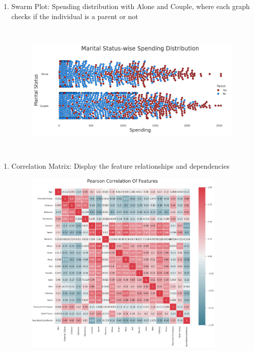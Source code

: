 \documentclass[11pt]{article}
\begin{document}
\begin{enumerate}
	\item Swarm Plot: Spending distribution with Alone and Couple, where each graph checks if the individual is a parent or not

\begin{figure}[H]
\centering
\includegraphics[width=14.24cm,height=6.52cm]{./images/image11.png}
\end{figure}


\end{enumerate}
\vspace{1\baselineskip}
\begin{enumerate}
	\item Correlation Matrix: Display the feature relationships and dependencies

\begin{figure}[H]
\centering
\includegraphics[width=9.67cm,height=8.9cm]{./images/image16.png}
\end{figure}


\end{enumerate}
\vspace{1\baselineskip}
\end{document}
